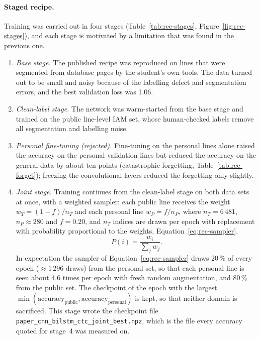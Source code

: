 \paragraph{Staged recipe.}
Training was carried out in four stages (Table~\ref{tab:rec-stages}, Figure~\ref{fig:rec-stages}), and each stage is motivated by a limitation that was found in the previous one.
\begin{enumerate}
\item \emph{Base stage.} The published recipe was reproduced on lines that were segmented from database pages by the student's own tools. The data turned out to be small and noisy because of the labelling defect and segmentation errors, and the best validation loss was 1.06.
\item \emph{Clean-label stage.} The network was warm-started from the base stage and trained on the public line-level IAM set, whose human-checked labels remove all segmentation and labelling noise.
\item \emph{Personal fine-tuning (rejected).} Fine-tuning on the personal lines alone raised the accuracy on the personal validation lines but reduced the accuracy on the general data by about ten points (catastrophic forgetting, Table~\ref{tab:rec-forget}); freezing the convolutional layers reduced the forgetting only slightly.
\item \emph{Joint stage.} Training continues from the clean-label stage on both data sets at once, with a weighted sampler: each public line receives the weight $w_T=(1-f)/n_T$ and each personal line $w_P=f/n_P$, where $n_T=6\,481$, $n_P\approx280$ and $f=0.20$, and $n_T$ indices are drawn per epoch with replacement with probability proportional to the weights, Equation~\ref{eq:rec-sampler},
\begin{equation}
P(i)=\frac{w_i}{\sum_jw_j}.
\label{eq:rec-sampler}
\end{equation}
In expectation the sampler of Equation~\ref{eq:rec-sampler} draws 20\,\% of every epoch ($\approx1\,296$ draws) from the personal set, so that each personal line is seen about 4.6 times per epoch with fresh random augmentation, and 80\,\% from the public set. The checkpoint of the epoch with the largest $\min(\text{accuracy}_{\mathrm{public}},\text{accuracy}_{\mathrm{personal}})$ is kept, so that neither domain is sacrificed. This stage wrote the checkpoint file \texttt{paper\_cnn\_bilstm\_ctc\_joint\_best.npz}, which is the file every accuracy quoted for stage~4 was measured on.
\end{enumerate}

